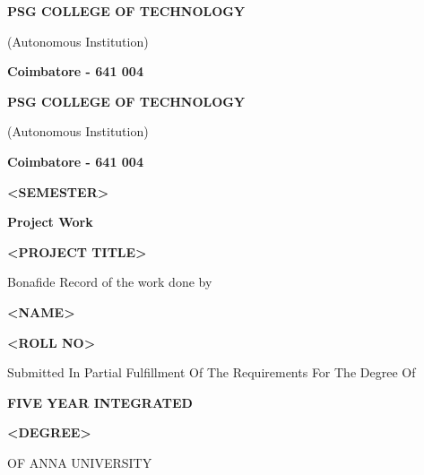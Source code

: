 \begin{titlepage}
\begin{center}
        \vspace{2.0cm}

        \textbf{\Large{PSG COLLEGE OF TECHNOLOGY}}

        ({Autonomous Institution})

        \vspace{1.0cm}

        \textbf{Coimbatore - 641 004}


        \vspace{3.0cm}

        \textbf{{PSG COLLEGE OF TECHNOLOGY}}

        ({Autonomous Institution})

        \vspace{0.1cm}

        \textbf{Coimbatore - 641 004}

        \vspace{0.5cm}

        \textbf{{<SEMESTER>}}

        \textbf{{Project Work}}

        \vspace{0.5cm}

        {\textbf{<PROJECT TITLE>}}

        \vspace{1.0cm}

        Bonafide Record of the work done by

        \vspace{0.5cm}

        \textbf{<NAME>}
        
        \vspace{0.1cm}
        
        \textbf{<ROLL NO>}
        \vspace{1.0cm}
            
        {Submitted In Partial Fulfillment Of
        The Requirements For The Degree Of}

        \vspace{0.5cm}
        
        \textbf{{FIVE YEAR INTEGRATED}}

        \vspace{0.1cm}
        \textbf{<DEGREE>}
        
        \vspace{0.5cm}

        {OF ANNA UNIVERSITY}       
        

\end{center}
\end{titlepage}
